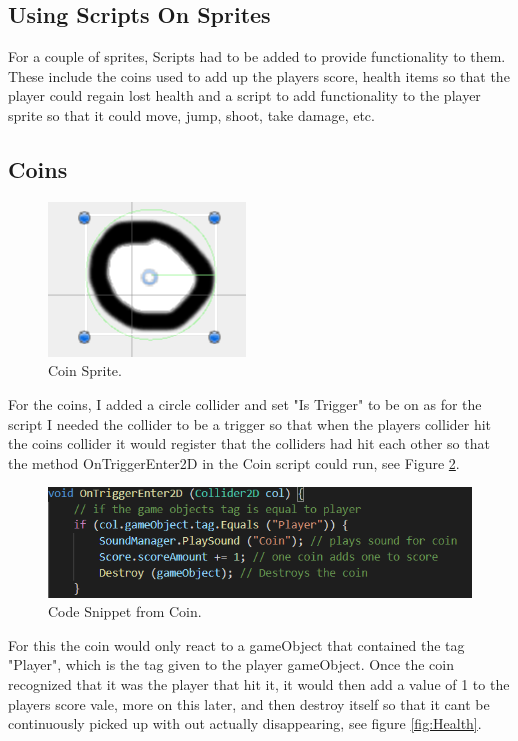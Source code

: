 \subsection{Using Scripts On Sprites}
For a couple of sprites, Scripts had to be added to provide functionality to them. These include the coins used to add up the players score, health items so that the player could regain lost health and a script to add functionality to the player sprite so that it could move, jump, shoot, take damage, etc. 

\subsection{Coins}

\begin{figure}[h]
\centering
  \includegraphics[width= 0.3\linewidth]{Images/Coin.PNG}
  \caption{Coin Sprite.}
  \label{fig:Coin}
\end{figure}

For the coins, I added a circle collider and set "Is Trigger" to be on as for the script I needed the collider to be a trigger so that when the players collider hit the coins collider it would register that the colliders had hit each other so that the method OnTriggerEnter2D in the Coin script could run, see Figure \ref{fig:CoinTrig}.

\begin{figure}[h]
\centering
  \includegraphics[width= 0.8\linewidth]{Images/CoinTrigger.PNG}
  \caption{Code Snippet from Coin.}
  \label{fig:CoinTrig}
\end{figure}

For this the coin would only react to a gameObject that contained the tag "Player", which is the tag given to the player gameObject. Once the coin recognized that it was the player that hit it, it would then add a value of 1 to the players score vale, more on this later, and then destroy itself so that it cant be continuously picked up with out actually disappearing, see figure \ref{fig:Health}.

